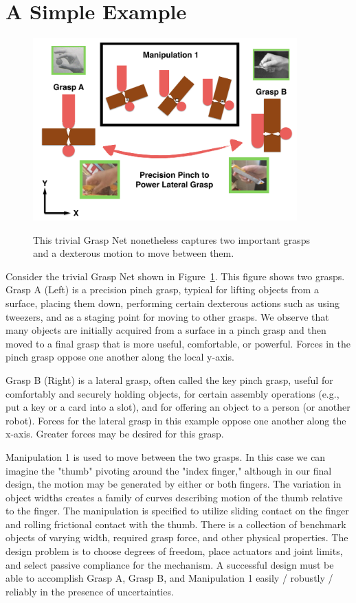 \section{A Simple Example}


\begin{figure}
\begin{center}
{\includegraphics[width=4in]{./figs/simpleExample.png}}
\end{center}
\vspace*{-0.3in}
\caption[]{This trivial Grasp Net nonetheless captures two important grasps and a dexterous motion to move between them.}
\label{SimpleGraspNet}
\end{figure}

Consider the trivial Grasp Net shown in Figure~\ref{SimpleGraspNet}.     This figure shows two grasps.   Grasp A (Left) is a precision pinch grasp, typical for lifting objects from a surface, placing them down, performing certain dexterous actions such as using tweezers, and as a staging point for moving to other grasps.   We observe that many objects are initially acquired from a surface in a pinch grasp and then moved to a final grasp that is more useful, comfortable, or powerful.    Forces in the pinch grasp oppose one another along the local y-axis.   

Grasp B (Right) is a lateral grasp, often called the key pinch grasp, useful for comfortably and securely holding objects, for certain assembly operations (e.g., put a key or a card into a slot), and for offering an object to a person (or another robot).   Forces for the lateral grasp in this example oppose one another along the x-axis.  Greater forces may be desired for this grasp.   

Manipulation 1 is used to move between the two grasps.   In this case we can imagine the "thumb" pivoting around the "index finger," although in our final design, the motion may be generated by either or both fingers.    The variation in object widths creates a family of curves describing motion of the thumb relative to the finger.   The manipulation is specified to utilize sliding contact on the finger and rolling frictional contact with the thumb.  There is a collection of benchmark objects of varying width, required grasp force, and other physical properties.   The design problem is to choose degrees of freedom, place actuators and joint limits, and select passive compliance for the mechanism.  A successful design must be able to accomplish Grasp A, Grasp B, and Manipulation 1 easily / robustly / reliably in the presence of uncertainties.

